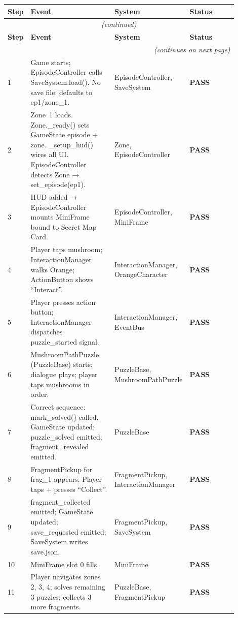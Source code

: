 \documentclass[12pt, a4paper]{article}
\newcommand{\statuspass}{\textcolor{passgre}{\textbf{PASS}}}
\begin{document}
\begin{longtable}{p{0.06\linewidth} p{0.38\linewidth} p{0.22\linewidth} p{0.24\linewidth}}
\toprule
\textbf{Step} & \textbf{Event} & \textbf{System} & \textbf{Status} \\
\midrule
\endfirsthead
\multicolumn{4}{c}{\small\textit{(continued)}} \\
\toprule
\textbf{Step} & \textbf{Event} & \textbf{System} & \textbf{Status} \\
\midrule
\endhead
\midrule
\multicolumn{4}{r}{\small\textit{(continues on next page)}} \\
\endfoot
\bottomrule
\endlastfoot

1  & Game starts; EpisodeController calls SaveSystem.load(). No save file: defaults to ep1/zone\_1. & EpisodeController, SaveSystem & \statuspass \\
2  & Zone~1 loads. Zone.\_ready() sets GameState episode + zone. \_setup\_hud() wires all UI. EpisodeController detects Zone → set\_episode(ep1). & Zone, EpisodeController & \statuspass \\
3  & HUD added → EpisodeController mounts MiniFrame bound to Secret Map Card. & EpisodeController, MiniFrame & \statuspass \\
4  & Player taps mushroom; InteractionManager walks Orange; ActionButton shows ``Interact''. & InteractionManager, OrangeCharacter & \statuspass \\
5  & Player presses action button; InteractionManager dispatches puzzle\_started signal. & InteractionManager, EventBus & \statuspass \\
6  & MushroomPathPuzzle (PuzzleBase) starts; dialogue plays; player taps mushrooms in order. & PuzzleBase, MushroomPathPuzzle & \statuspass \\
7  & Correct sequence: mark\_solved() called. GameState updated; puzzle\_solved emitted; fragment\_revealed emitted. & PuzzleBase & \statuspass \\
8  & FragmentPickup for frag\_1 appears. Player taps + presses ``Collect''. & FragmentPickup, InteractionManager & \statuspass \\
9  & fragment\_collected emitted; GameState updated; save\_requested emitted; SaveSystem writes save.json. & FragmentPickup, SaveSystem & \statuspass \\
10 & MiniFrame slot 0 fills. & MiniFrame & \statuspass \\
11 & Player navigates zones 2, 3, 4; solves remaining 3 puzzles; collects 3 more fragments. & PuzzleBase, FragmentPickup & \statuspass \\

\end{longtable}
\end{document}
